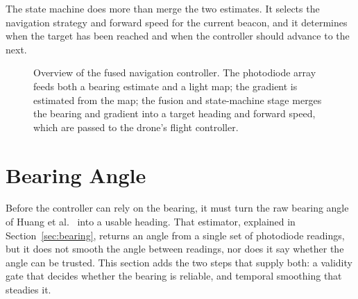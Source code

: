 The state machine does more than merge the two estimates. It selects the navigation strategy and forward speed for the current beacon, and it determines when the target has been reached and when the controller should advance to the next.


\begin{figure}[h]
    \centering
    \caption{Overview of the fused navigation controller. The photodiode array feeds both a bearing estimate and a light map; the gradient is estimated from the map; the fusion and state-machine stage merges the bearing and gradient into a target heading and forward speed, which are passed to the drone's flight controller.}
    \label{fig:controller-overview}
\end{figure}

\section{Bearing Angle}
\label{sec:bearing-angle}

Before the controller can rely on the bearing, it must turn the raw bearing angle of Huang et al.~\cite{huang2026lta} into a usable heading. That estimator, explained in Section~\ref{sec:bearing}, returns an angle from a single set of photodiode readings, but it does not smooth the angle between readings, nor does it say whether the angle can be trusted. This section adds the two steps that supply both: a validity gate that decides whether the bearing is reliable, and temporal smoothing that steadies it.

